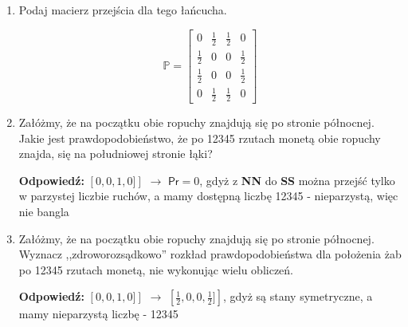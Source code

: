 \begin{enumerate}[label=\alph*)]
\item Podaj macierz przejścia dla tego łańcucha.

$$\mathbb{P}=\begin{bmatrix}
0&\frac{1}{2}&\frac{1}{2}&0\\
\frac{1}{2}&0&0&\frac{1}{2}\\
\frac{1}{2}&0&0&\frac{1}{2}\\
0&\frac{1}{2}&\frac{1}{2}&0
\end{bmatrix}$$
\item Załóżmy, że na początku obie ropuchy znajdują się po stronie północnej. Jakie jest prawdopodobieństwo, że po 12345 rzutach monetą obie ropuchy znajda, się na południowej stronie łąki?

\textbf{Odpowiedź: }$\left[0,0,1,0]\right]$ $\rightarrow$ $\mathsf{Pr}=0$, gdyż z \textbf{NN} do \textbf{SS} można przejść tylko w parzystej liczbie ruchów, a mamy dostępną liczbę 12345 - nieparzystą, więc nie bangla
\item  Załóżmy, że na początku obie ropuchy znajdują się po stronie północnej. Wyznacz ,,zdroworozsądkowo'' rozkład prawdopodobieństwa dla położenia żab po 12345 rzutach monetą, nie wykonując wielu obliczeń.

\textbf{Odpowiedź: }$\left[0,0,1,0]\right]$ $\rightarrow$ $\left[\frac{1}{2},0,0,\frac{1}{2}]\right]$, gdyż są stany symetryczne, a mamy nieparzystą liczbę - 12345
\end{enumerate}


